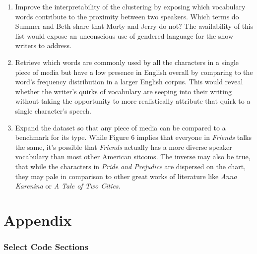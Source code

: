 \documentclass{article}
\begin{document}
\begin{titlepage}
\begin{enumerate}
\item Improve the interpretability of the clustering by exposing which vocabulary words contribute to the proximity between two speakers. Which terms do Summer and Beth share that Morty and Jerry do not? The availability of this list would expose an unconscious use of gendered language for the show writers to address.
\item Retrieve which words are commonly used by all the characters in a single piece of media but have a low presence in English overall by comparing to the word's frequency distribution in a larger English corpus. This would reveal whether the writer's quirks of vocabulary are seeping into their writing without taking the opportunity to more realistically attribute that quirk to a single character's speech.
\item Expand the dataset so that any piece of media can be compared to a benchmark for its type. While Figure 6 implies that everyone in \textit{Friends} talks the same, it's possible that \textit{Friends} actually has a more diverse speaker vocabulary than most other American sitcoms. The inverse may also be true, that while the characters in \textit{Pride and Prejudice} are dispersed on the chart, they may pale in comparison to other great works of literature like \textit{Anna Karenina} or \textit{A Tale of Two Cities}.
\end{enumerate}

\begin{enumerate}

\end{enumerate}

\section{Appendix}
\subsubsection{Select Code Sections}


\end{titlepage}
\end{document}
